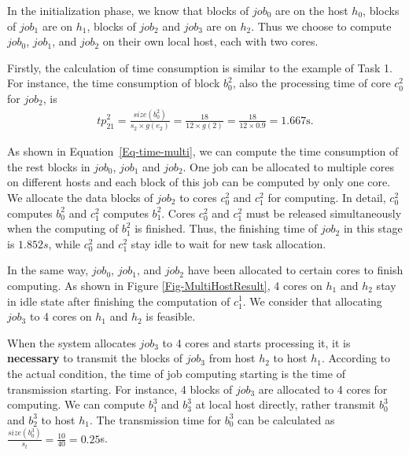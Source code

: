 \documentclass{llncs}
\begin{document}
In the initialization phase, we know that blocks of $job_0$ are on the host $h_0$, blocks of $job_1$ are on $h_1$, blocks of $job_2$ and $job_3$ are on $h_2$. Thus we choose to compute $job_0$, $job_1$, and $job_2$ on their own local host, each with two cores.

Firstly, the calculation of time consumption is similar to the example of Task 1. For instance, the time consumption of block $b^2_0$, also the processing time of core $c^2_0$ for $job_2$, is
\begin{equation}
\begin{aligned}
{tp}^2_{21}=\frac{size(b^2_0)}{s_2\times{g(e_2)}}=\frac{18}{12\times{g(2)}}=\frac{18}{12\times0.9}=1.667\text{s}.
\label{Eq-time-multi}
\end{aligned}
\end{equation}

As shown in Equation~\eqref{Eq-time-multi}, we can compute the time consumption of the rest blocks in $job_0$, $job_1$ and $job_2$. One job can be allocated to multiple cores on different hosts and each block of this job can be computed by only one core. We allocate the data blocks of $job_2$ to cores $c^2_0$ and $c^2_1$ for computing. In detail, $c^2_0$ computes $b^2_0$ and $c^2_1$ computes $b^2_1$. Cores $c^2_0$ and $c^2_1$ must be released simultaneously when the computing of $b^2_1$ is finished. Thus, the finishing time of $job_2$ in this stage is $1.852s$, while $c^2_0$ and $c^2_1$ stay idle to wait for new task allocation.

In the same way, $job_0$, $job_1$, and $job_2$ have been allocated to certain cores to finish computing. As shown in Figure \ref{Fig-MultiHostResult}, 4 cores on $h_1$ and $h_2$ stay in idle state after finishing the computation of $c^1_1$. We consider that allocating $job_3$ to 4 cores on $h_1$ and $h_2$ is feasible.

When the system allocates $job_3$ to 4 cores and starts processing it, it is \textbf{necessary} to transmit the blocks of $job_3$ from host $h_2$ to host $h_1$. According to the actual condition, the time of job computing starting is the time of transmission starting. For instance, 4 blocks of $job_3$ are allocated to 4 cores for computing. We can compute $b^3_1$ and $b^3_3$ at local host directly, rather transmit $b^3_0$ and $b^3_2$ to host $h_1$. The transmission time for $b^3_0$ can be calculated as $\frac{size(b^3_0)}{s_t}=\frac{10}{40}=0.25$s.

\end{document}
